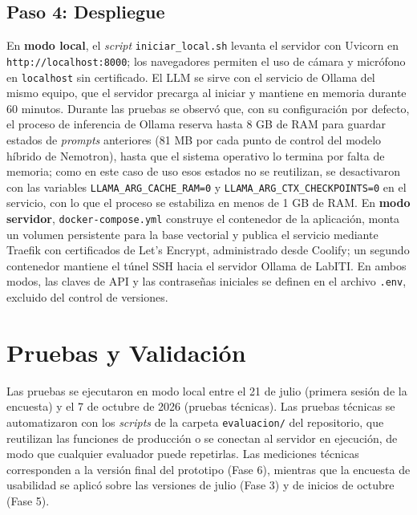 \subsection{Paso 4: Despliegue}
En \textbf{modo local}, el \textit{script} \texttt{iniciar\_\allowbreak{}local.\allowbreak{}sh} levanta el servidor con Uvicorn en \texttt{http:/\allowbreak{}/\allowbreak{}localhost:8000}; los navegadores permiten el uso de cámara y micrófono en \texttt{localhost} sin certificado. El LLM se sirve con el servicio de Ollama del mismo equipo, que el servidor precarga al iniciar y mantiene en memoria durante 60 minutos. Durante las pruebas se observó que, con su configuración por defecto, el proceso de inferencia de Ollama reserva hasta 8 GB de RAM para guardar estados de \textit{prompts} anteriores (81 MB por cada punto de control del modelo híbrido de Nemotron), hasta que el sistema operativo lo termina por falta de memoria; como en este caso de uso esos estados no se reutilizan, se desactivaron con las variables \texttt{LLAMA\_\allowbreak{}ARG\_\allowbreak{}CACHE\_\allowbreak{}RAM=0} y \texttt{LLAMA\_\allowbreak{}ARG\_\allowbreak{}CTX\_\allowbreak{}CHECKPOINTS=0} en el servicio, con lo que el proceso se estabiliza en menos de 1 GB de RAM. En \textbf{modo servidor}, \texttt{docker-\allowbreak{}compose.\allowbreak{}yml} construye el contenedor de la aplicación, monta un volumen persistente para la base vectorial y publica el servicio mediante Traefik con certificados de Let's Encrypt, administrado desde Coolify; un segundo contenedor mantiene el túnel SSH hacia el servidor Ollama de LabITI. En ambos modos, las claves de API y las contraseñas iniciales se definen en el archivo \texttt{.env}, excluido del control de versiones.

\section{Pruebas y Validación}
\label{sec:pruebas}
Las pruebas se ejecutaron en modo local entre el 21 de julio (primera sesión de la encuesta) y el 7 de octubre de 2026 (pruebas técnicas). Las pruebas técnicas se automatizaron con los \textit{scripts} de la carpeta \texttt{evaluacion/} del repositorio, que reutilizan las funciones de producción o se conectan al servidor en ejecución, de modo que cualquier evaluador puede repetirlas. Las mediciones técnicas corresponden a la versión final del prototipo (Fase 6), mientras que la encuesta de usabilidad se aplicó sobre las versiones de julio (Fase 3) y de inicios de octubre (Fase 5).

